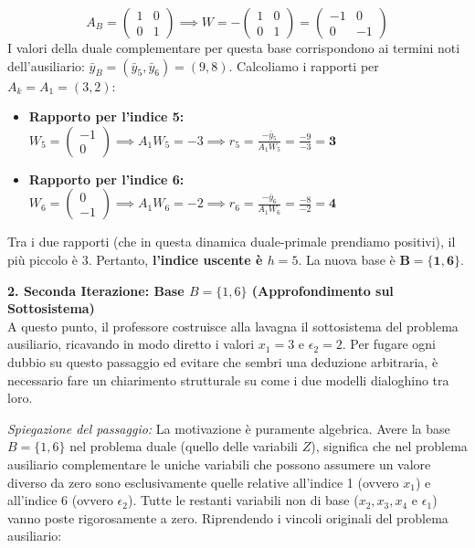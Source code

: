 \documentclass[12pt, a4paper]{article}
\begin{document}
	$$A_B = \begin{pmatrix} 1 & 0 \\ 0 & 1 \end{pmatrix} \implies W = -\begin{pmatrix} 1 & 0 \\ 0 & 1 \end{pmatrix} = \begin{pmatrix} -1 & 0 \\ 0 & -1 \end{pmatrix}$$
	I valori della duale complementare per questa base corrispondono ai termini noti dell'ausiliario: $\bar{y}_B = (\bar{y}_5, \bar{y}_6) = (9, 8)$.
	Calcoliamo i rapporti per $A_k = A_1 = (3, 2)$:
	\begin{itemize}[label=$\circ$, itemsep=2pt, leftmargin=1.5cm]
		\item \textbf{Rapporto per l'indice 5:} $W_5 = \begin{pmatrix} -1 \\ 0 \end{pmatrix} \implies A_1 W_5 = -3 \implies r_5 = \frac{-\bar{y}_5}{A_1 W_5} = \frac{-9}{-3} = \mathbf{3}$
		\item \textbf{Rapporto per l'indice 6:} $W_6 = \begin{pmatrix} 0 \\ -1 \end{pmatrix} \implies A_1 W_6 = -2 \implies r_6 = \frac{-\bar{y}_6}{A_1 W_6} = \frac{-8}{-2} = \mathbf{4}$
	\end{itemize}
	Tra i due rapporti (che in questa dinamica duale-primale prendiamo positivi), il più piccolo è $3$. Pertanto, \textbf{l'indice uscente è $h = 5$}. La nuova base è $\mathbf{B = \{1, 6\}}$.
	
	\vspace{0.4cm}
	\textbf{2. Seconda Iterazione: Base $B = \{1, 6\}$ (Approfondimento sul Sottosistema)}\\
	A questo punto, il professore costruisce alla lavagna il sottosistema del problema ausiliario, ricavando in modo diretto i valori $x_1 = 3$ e $\epsilon_2 = 2$. Per fugare ogni dubbio su questo passaggio ed evitare che sembri una deduzione arbitraria, è necessario fare un chiarimento strutturale su come i due modelli dialoghino tra loro.
	
	\textit{Spiegazione del passaggio:} La motivazione è puramente algebrica. Avere la base $B=\{1, 6\}$ nel problema duale (quello delle variabili $Z$), significa che nel problema ausiliario complementare le uniche variabili che possono assumere un valore diverso da zero sono esclusivamente quelle relative all'indice 1 (ovvero $x_1$) e all'indice 6 (ovvero $\epsilon_2$). Tutte le restanti variabili non di base ($x_2, x_3, x_4$ e $\epsilon_1$) vanno poste rigorosamente a zero.
	Riprendendo i vincoli originali del problema ausiliario:
	
\end{document}
